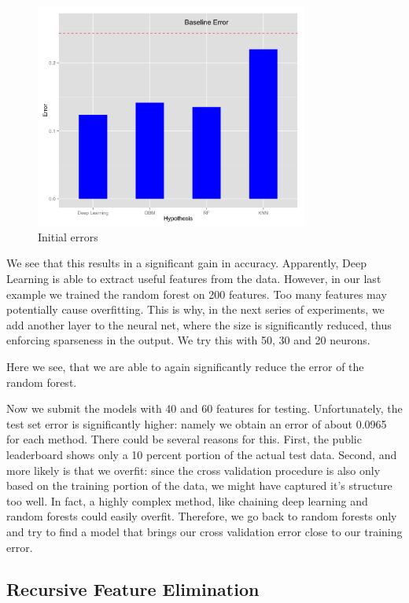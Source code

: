 \documentclass[paper=a4, fontsize=11pt]{scrartcl}
\numberwithin{equation}{section}
\numberwithin{figure}{section}
\numberwithin{table}{section}
\begin{document}
\begin{figure}[H]
    \centering
    \includegraphics[width=0.8\textwidth]{barchart_initial_errors.png}
    \caption{Initial errors}
    \label{fig:errors}
\end{figure}

We see that this results in a significant gain in accuracy. Apparently, Deep Learning is able to extract useful features from the data. However, in our last example we trained the random forest on 200 features. Too many features may potentially cause overfitting. This is why, in the next series of experiments, we add another layer to the neural net, where the size is significantly reduced, thus enforcing sparseness in the output. We try this with 50, 30 and 20 neurons. 


Here we see, that we are able to again significantly reduce the error of the random forest. 

Now we submit the models with 40 and 60 features for testing. Unfortunately, the test set error is significantly higher: namely we obtain an error of about 0.0965 for each method.
There could be several reasons for this. First, the public leaderboard shows only a 10 percent portion of the actual test data. Second, and more likely is that we overfit: since the cross validation procedure is also only based on the training portion of the data, we might have captured it's structure too well. In fact, a highly complex method, like chaining deep learning and random forests could easily overfit. Therefore, we go back to random forests only and try to find a model that brings our cross validation error close to our training error. 

\subsection{Recursive Feature Elimination}
\end{document}
